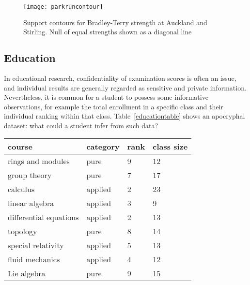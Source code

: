 \documentclass[article]{ajs}
\begin{document}
\begin{figure}[t]
  \begin{centering}
\texttt{[image: parkruncontour]} %
\caption{Support contours for Bradley-Terry strength
  at \label{parkruncontour} Auckland and Stirling.  Null of equal
  strengths shown as a diagonal line}
\end{centering}
\end{figure}


\subsection{Education}

In educational research, confidentiality of examination scores is
often an issue, and individual results are generally regarded as
sensitive and private information.  Nevertheless, it is common for a
student to possess some informative observations, for example the
total enrollment in a specific class and their individual ranking
within that class.  Table~\ref{educationtable} shows an apocryphal
dataset: what could a student infer from such data?

\begin{table*}[t]
  \caption{Educational dataset}
\label{educationtable}
\begin{tabular}{llll}
\hline
                   course&category   &rank&class size\\ \hline
      rings and modules  &  pure     & 9  &      12\\
           group theory  &  pure     & 7  &      17\\
               calculus  & applied   & 2  &      23\\
         linear algebra  & applied   & 3  &       9\\
 differential equations  & applied   & 2  &      13\\
               topology  &   pure    & 8  &      14\\
     special relativity  & applied   & 5  &      13\\
        fluid mechanics  & applied   & 4  &      12\\
            Lie algebra  &   pure    & 9  &      15\\
     \hline
\end{tabular}
\end{table*}
\end{document}
